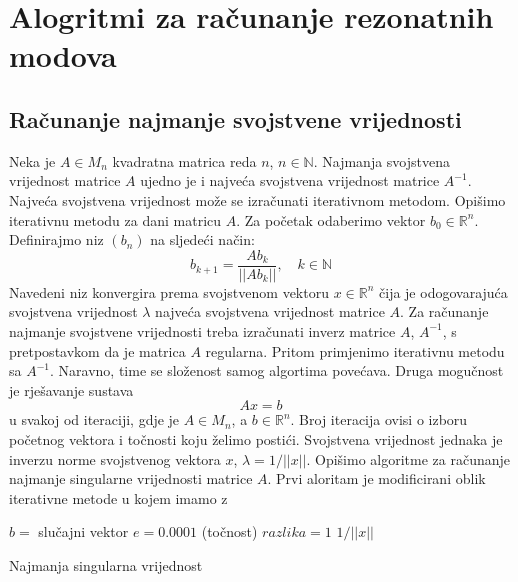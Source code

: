 \documentclass[a4paper,twoside,12pt]{memoir} %
\begin{document}
\chapter{Alogritmi za računanje rezonatnih modova }

\section{Računanje najmanje svojstvene vrijednosti}

Neka je $A \in M_n$ kvadratna matrica reda $n$, $n\in \mathbb{N}$. Najmanja svojstvena vrijednost matrice $A$ ujedno je i najveća svojstvena vrijednost matrice $A^{-1}$. Najveća svojstvena vrijednost može se izračunati iterativnom metodom. Opišimo iterativnu metodu za dani matricu $A$. Za početak odaberimo vektor $b_0 \in \mathbb{R}^{n}$. Definirajmo niz $(b_n)$ na sljedeći način: $$b_{k+1}=\frac{Ab_k}{||Ab_k||},\quad k \in \mathbb{N}$$ Navedeni niz konvergira prema svojstvenom vektoru $x \in \mathbb{R}^n$ čija je odogovarajuća svojstvena vrijednost $\lambda$ najveća svojstvena vrijednost matrice $A$.
Za računanje najmanje svojstvene vrijednosti treba izračunati inverz matrice $A$,  $A^{-1}$, s pretpostavkom da je matrica $A$ regularna. Pritom primjenimo iterativnu metodu sa $A^{-1}$. Naravno, time se složenost samog algortima povećava. Druga mogučnost je rješavanje sustava
\begin{equation}
\label{eq:Ax=b}
	Ax=b
\end{equation}
 u svakoj od iteraciji, gdje je $A \in M_n$, a $b \in \mathbb{R}^n$.  Broj iteracija ovisi o izboru početnog vektora i točnosti koju želimo postići. Svojstvena vrijednost jednaka je inverzu norme svojstvenog vektora $x$, $\lambda=1/||x||$. Opišimo algoritme za računanje najmanje singularne vrijednosti matrice $A$.\newpage
Prvi aloritam je modificirani oblik iterativne metode u kojem imamo z \\

\begin{algorithm}[H]
\SetAlgoLined
{}
 	$b=$ slučajni vektor \;
 	$e = 0.0001$ (točnost)\;
 	$razlika = 1$\;
 	\Return $1/||x||$
 \caption{Najmanja singularna vrijednost }
\end{algorithm}

\vspace{.5cm}
\end{document}
